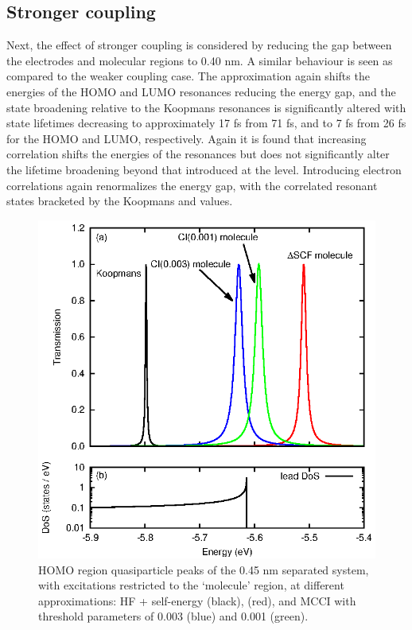 \subsection{Stronger coupling}
Next, the effect of stronger coupling is considered by reducing the gap
between the electrodes and molecular regions to 0.40 nm.
A similar behaviour is seen as compared to the weaker coupling case. The
\dscf approximation again shifts the energies of the HOMO and LUMO
resonances reducing the energy gap, and the state broadening relative to
the Koopmans resonances is significantly altered with state lifetimes
decreasing to approximately 17 fs from 71 fs, and to 7 fs from 26 fs for
the HOMO and LUMO, respectively.
Again it is found that increasing correlation shifts the energies of the
resonances but does not significantly alter the lifetime broadening beyond
that introduced at the \dscf level. Introducing electron correlations
again renormalizes the energy gap, with the correlated resonant states
bracketed by the Koopmans and \dscf values.

\begin{figure}
	\begin{center}
		\includegraphics[width=0.9\linewidth]{figures/figure4a_4b}
	\end{center}
	\caption{HOMO region quasiparticle peaks of the 0.45 nm separated
	         system, with excitations restricted to the `molecule' region,
		 at different approximations: HF + self-energy (black),
		 \dscf (red), and MCCI with threshold parameters of
		 0.003 (blue) and 0.001 (green).}
	\label{fig:all45Ahomo}
\end{figure}

